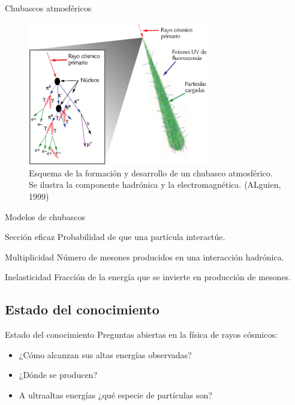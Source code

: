 \documentclass[11pt,table,compress]{beamer}
\begin{document}
	\begin{frame}{Chubascos atmosféricos}
		\begin{figure}
		\centering
		\includegraphics[width=0.7\textwidth]{Figuras/air_shower} 
		\caption{Esquema de la formación y desarrollo de un chubasco atmosférico. Se ilustra la componente hadrónica y la electromagnética. 				(ALguien, 1999)}
		\label{fig:airshower}
		\end{figure}	
	\end{frame}	
	
	\begin{frame}{Modelos de chubascos}
		\begin{block}{Sección eficaz}
		Probabilidad de que una partícula interactúe.
		\end{block}	
		\vspace{5 mm}
		\begin{block}{Multiplicidad}
		Número de mesones producidos en una interacción hadrónica.
		\end{block}	
		\vspace{5 mm}
		\begin{block}{Inelasticidad}
		Fracción de la energía que se invierte en producción de mesones.
		\end{block}			
	\end{frame}		
	
	
	\subsection{Estado del conocimiento}
	\begin{frame}{Estado del conocimiento}
	Preguntas abiertas en la física de rayos cósmicos: \vspace{4 mm}
		\begin{itemize}
		\item ¿Cómo alcanzan sus altas energías observadas? \vspace{3 mm}
		\item ¿Dónde se producen?\vspace{3 mm}
		\item A ultraaltas energías ¿qué especie de partículas son?
		\end{itemize}
	\end{frame}
	
\end{document}
